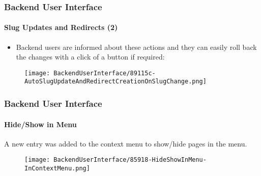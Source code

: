 
\begin{frame}[fragile]
	\frametitle{Backend User Interface}
	\framesubtitle{Slug Updates and Redirects (2)}

	\begin{itemize}
		\item Backend users are informed about these actions and they can
			easily roll back the changes with a click of a button if required:

	\end{itemize}

	\begin{figure}
		\texttt{[image: BackendUserInterface/89115c-AutoSlugUpdateAndRedirectCreationOnSlugChange.png]}
	\end{figure}

\end{frame}


\begin{frame}[fragile]
	\frametitle{Backend User Interface}
	\framesubtitle{Hide/Show in Menu}

	A new entry was added to the context menu to show/hide pages in the menu.

	\begin{figure}
		\texttt{[image: BackendUserInterface/85918-HideShowInMenu-InContextMenu.png]}
	\end{figure}

\end{frame}

